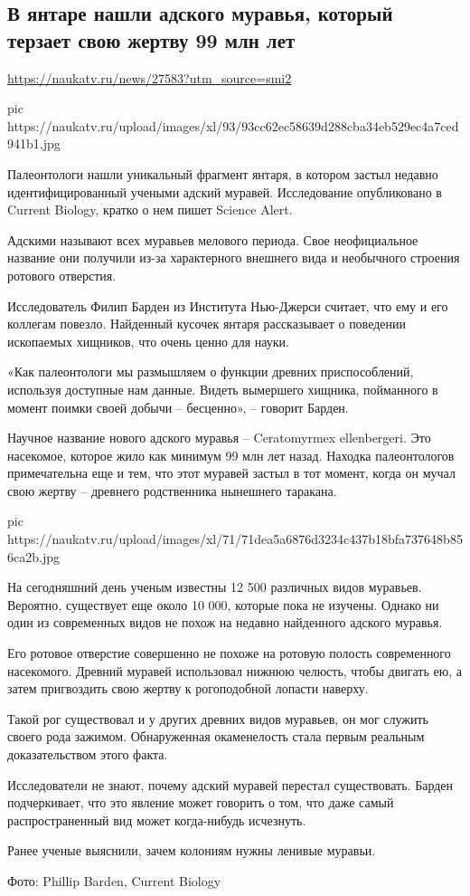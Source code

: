  
 

\subsection{В янтаре нашли адского муравья, который терзает свою жертву 99 млн лет}

\url{https://naukatv.ru/news/27583?utm_source=smi2}

\ifcmt
  pic https://naukatv.ru/upload/images/xl/93/93cc62ec58639d288cba34eb529ec4a7ced941b1.jpg
\fi

Палеонтологи нашли уникальный фрагмент янтаря, в котором застыл недавно
идентифицированный учеными адский муравей. Исследование опубликовано в Current
Biology, кратко о нем пишет Science Alert.

Адскими называют всех муравьев мелового периода. Свое неофициальное название
они получили из-за характерного внешнего вида и необычного строения ротового
отверстия.

Исследователь Филип Барден из Института Нью-Джерси считает, что ему и его
коллегам повезло. Найденный кусочек янтаря рассказывает о поведении ископаемых
хищников, что очень ценно для науки.

«Как палеонтологи мы размышляем о функции древних приспособлений, используя
доступные нам данные. Видеть вымершего хищника, пойманного в момент поимки
своей добычи – бесценно», – говорит Барден.

Научное название нового адского муравья – Ceratomyrmex ellenbergeri. Это
насекомое, которое жило как минимум 99 млн лет назад. Находка палеонтологов
примечательна еще и тем, что этот муравей застыл в тот момент, когда он мучал
свою жертву – древнего родственника нынешнего таракана.

\ifcmt
pic https://naukatv.ru/upload/images/xl/71/71dea5a6876d3234c437b18bfa737648b856ca2b.jpg
\fi

На сегодняшний день ученым известны 12 500 различных видов муравьев. Вероятно,
существует еще около 10 000, которые пока не изучены. Однако ни один из
современных видов не похож на недавно найденного адского муравья.

Его ротовое отверстие совершенно не похоже на ротовую полость современного
насекомого. Древний муравей использовал нижнюю челюсть, чтобы двигать ею, а
затем пригвоздить свою жертву к рогоподобной лопасти наверху.

Такой рог существовал и у других древних видов муравьев, он мог служить своего
рода зажимом. Обнаруженная окаменелость стала первым реальным доказательством
этого факта.

Исследователи не знают, почему адский муравей перестал существовать. Барден
подчеркивает, что это явление может говорить о том, что даже самый
распространенный вид может когда-нибудь исчезнуть.   

Ранее ученые выяснили, зачем колониям нужны ленивые муравьи.

Фото: Phillip Barden, Current Biology

